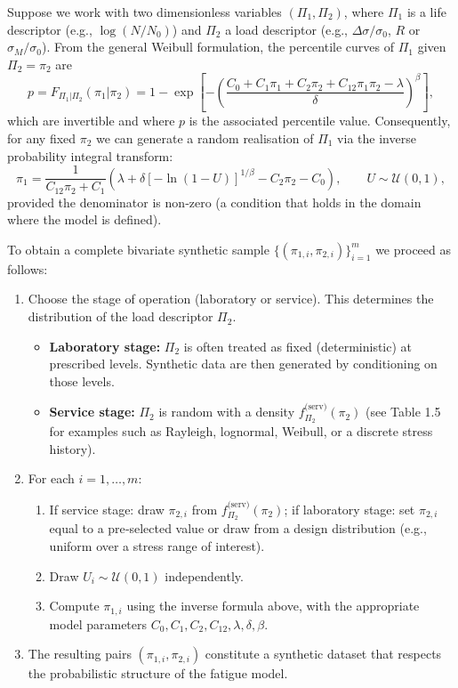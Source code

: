 Suppose we work with two dimensionless variables \((\Pi_1,\Pi_2)\), where \(\Pi_1\) is a life descriptor (e.g., \(\log(N/N_0)\)) and \(\Pi_2\) a load descriptor (e.g., \(\Delta\sigma/\sigma_0\), \(R\) or \(\sigma_M/\sigma_0\)). From the general Weibull formulation, the percentile curves of \(\Pi_1\) given \(\Pi_2=\pi_2\) are
\begin{equation}
p = F_{\Pi_1|\Pi_2}(\pi_1|\pi_2)=1-\exp\left[-\left(\frac{C_0+C_1\pi_1+C_2\pi_2+C_{12}\pi_1\pi_2-\lambda}{\delta}\right)^{\beta}\right],
\end{equation}
which are invertible and where $p$ is the associated percentile value. Consequently, for any fixed \(\pi_2\) we can generate a random realisation of \(\Pi_1\) via the inverse probability integral transform:
\[
\pi_1 = \frac{1}{C_{12}\pi_2+C_1}\left(\lambda+\delta\left[-\ln(1-U)\right]^{1/\beta} - C_2\pi_2 - C_0\right),\qquad U\sim\mathcal{U}(0,1),
\]
provided the denominator is non‑zero (a condition that holds in the domain where the model is defined).

To obtain a complete bivariate synthetic sample \(\{(\pi_{1,i},\pi_{2,i})\}_{i=1}^{m}\) we proceed as follows:

\begin{enumerate}
    \item Choose the stage of operation (laboratory or service). This determines the distribution of the load descriptor \(\Pi_2\).
    \begin{itemize}
        \item \textbf{Laboratory stage:} \(\Pi_2\) is often treated as fixed (deterministic) at prescribed levels. Synthetic data are then generated by conditioning on those levels.
        \item \textbf{Service stage:} \(\Pi_2\) is random with a density \(f_{\Pi_2}^{\text{(serv)}}(\pi_2)\) (see Table 1.5 for examples such as Rayleigh, lognormal, Weibull, or a discrete stress history).
    \end{itemize}
    \item For each \(i=1,\dots,m\):
    \begin{enumerate}
        \item If service stage: draw \(\pi_{2,i}\) from \(f_{\Pi_2}^{\text{(serv)}}(\pi_2)\); if laboratory stage: set \(\pi_{2,i}\) equal to a pre‑selected value or draw from a design distribution (e.g., uniform over a stress range of interest).
        \item Draw \(U_i\sim\mathcal{U}(0,1)\) independently.
        \item Compute \(\pi_{1,i}\) using the inverse formula above, with the appropriate model parameters \(C_0,C_1,C_2,C_{12},\lambda,\delta,\beta\).
    \end{enumerate}
    \item The resulting pairs \((\pi_{1,i},\pi_{2,i})\) constitute a synthetic dataset that respects the probabilistic structure of the fatigue model.
\end{enumerate}

